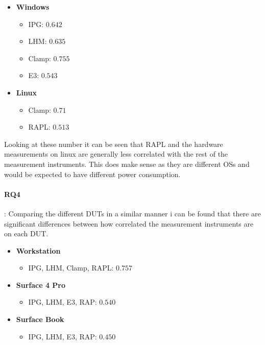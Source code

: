 \begin{itemize}
    \item \textbf{Windows}
    \begin{itemize}
        \item IPG: $0.642$ %
        \item LHM: $0.635$ %
        \item Clamp: $0.755$ %
        \item E3: $0.543$ %
    \end{itemize}
    \item \textbf{Linux}
    \begin{itemize}
        \item Clamp: $0.71$ %
        \item RAPL: $0.513$ %
    \end{itemize}
\end{itemize}

Looking at these number it can be seen that RAPL and the hardware measurements on linux are generally less correlated with the rest of the measurement instruments. This does make sense as they are different OSs and would be expected to have different power consumption.

\paragraph{RQ4}: Comparing the different DUTs in a similar manner i can be found that there are significant differences between how correlated the measurement instruments are on each DUT.

\begin{itemize}
    \item \textbf{Workstation}
    \begin{itemize}
        \item IPG, LHM, Clamp, RAPL: $0.757$%
    \end{itemize}
    \item \textbf{Surface 4 Pro}
    \begin{itemize}
        \item IPG, LHM, E3, RAP: $0.540$%
    \end{itemize}
    \item \textbf{Surface Book}
    \begin{itemize}
        \item IPG, LHM, E3, RAP: $0.450$ %
    \end{itemize}
\end{itemize}

